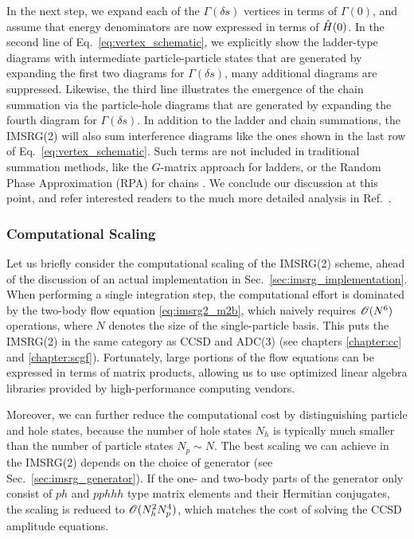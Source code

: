 In the next step, we expand each of the $\Gamma(\delta s)$ vertices in
terms of $\Gamma(0)$, and assume that energy denominators are now
expressed in terms of $\hat{H}(0)$. In the second line of Eq.~\eqref{eq:vertex_schematic},
we explicitly show the ladder-type diagrams with intermediate 
particle-particle states that are generated by expanding
the first two diagrams for $\Gamma(\delta s)$, many additional diagrams
are suppressed. Likewise, the third line illustrates the emergence of 
the chain summation via the particle-hole diagrams that 
are generated by expanding the fourth diagram for $\Gamma(\delta s)$.
In addition to the ladder and chain summations, the IMSRG(2) will also
sum interference diagrams like the ones shown in the last row of 
Eq.~\eqref{eq:vertex_schematic}.
Such terms are not included in traditional summation methods, like
the $G$-matrix approach for ladders, or the Random Phase Approximation
(RPA) for chains \cite{Day:1967zl,Brandow:1967tg,Fetter:2003ve}. We
conclude our discussion at this point, and refer interested readers
to the much more detailed analysis in Ref.~\cite{Hergert:2016jk}.

%
%
\subsubsection{Computational Scaling}
Let us briefly consider the computational scaling of the IMSRG(2) scheme,
ahead of the discussion of an actual implementation in Sec.~\ref{sec:imsrg_implementation}.
When performing a single integration step, the computational effort is 
dominated by the two-body flow equation \eqref{eq:imsrg2_m2b}, which 
naively requires $\mathcal{O}(N^6)$ operations, where $N$ denotes the size of
the single-particle basis. This puts the IMSRG(2) in the same category 
as CCSD and ADC(3) (see chapters \ref{chapter:cc} and \ref{chapter:scgf}).
Fortunately, large portions of the flow equations can be expressed in 
terms of matrix products, allowing us to use optimized linear algebra 
libraries provided by high-performance computing vendors. 

Moreover, we can further reduce the computational cost by distinguishing 
particle and hole states, because the number of hole states $N_h$ is 
typically much smaller than the number of particle states $N_p\sim N$. 
The best scaling we can achieve in the IMSRG(2) depends on the choice of 
generator (see Sec.~\ref{sec:imsrg_generator}). If the one- and two-body parts of the 
generator only consist of $ph$ and $pphhh$ type matrix elements and their 
Hermitian conjugates, the scaling is reduced to $\mathcal{O}(N_h^2N_p^4)$, 
which matches the cost of solving the CCSD amplitude equations.


